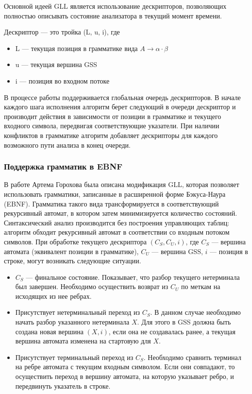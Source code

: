 Основной идеей GLL является использование дескрипторов, позволяющих полностью описывать состояние анализатора в текущий момент времени.

\begin{defn}
	Дескриптор --- это тройка (L, u, i), где
	\begin{itemize}
		\setlength\itemsep{0em}
		\item L --- текущая позиция в грамматике вида $A \rightarrow \alpha \cdot \beta$
		\item u --- текущая вершина GSS
		\item i --- позиция во входном потоке 
	\end{itemize}
\end{defn}  

В процессе работы поддерживается глобальная очередь дескрипторов. В начале каждого шага исполнения алгоритм берет следующий в очереди дескриптор и производит действия в зависимости от позиции в грамматике и текущего входного символа, передвигая соответствующие указатели. 
При наличии конфликтов в грамматике алгоритм добавляет дескрипторы для каждого возможного пути анализа в конец очереди.

\subsubsection{Поддержка грамматик в EBNF}

В работе Артема Горохова \cite{Gorokhov2017ebnf} была описана модификация GLL, которая позволяет использовать грамматики, записанные в расширенной форме Бэкуса-Наура (EBNF). Грамматика такого вида трансформируется в соответствующий рекурсивный автомат, в котором затем минимизируется количество состояний. Синтаксический анализ производится без построения управляющих таблиц: алгоритм обходит рекурсивный автомат в соответствии со входным потоком символов. При обработке текущего дескриптора $(C_S, C_U, i)$, где $C_S$ --- вершина автомата (эквивалент позиции в грамматике), $C_U$ --- вершина GSS, $i$ --- позиция в строке, могут возникать следующие ситуации.

\begin{itemize}
	\item $C_S$ --- финальное состояние. Показывает, что разбор текущего нетерминала был завершен. Необходимо осуществить возврат из $C_U$ по меткам на исходящих из нее ребрах.
	\item Присутствует нетерминальный переход из $C_S$. В данном случае необходимо начать разбор указанного нетерминала $X$. Для этого в GSS должна быть создана новая вершина $(X, i)$, если она не создавалась ранее, а текущая вершина автомата изменена на стартовую для $X$.
	\item Присутствует терминальный переход из $C_S$. Необходимо сравнить терминал на ребре автомата с текущим входным символом. Если они совпадают, то осуществить переход в вершину автомата, на которую указывает ребро, и передвинуть указатель в строке.
\end{itemize}

